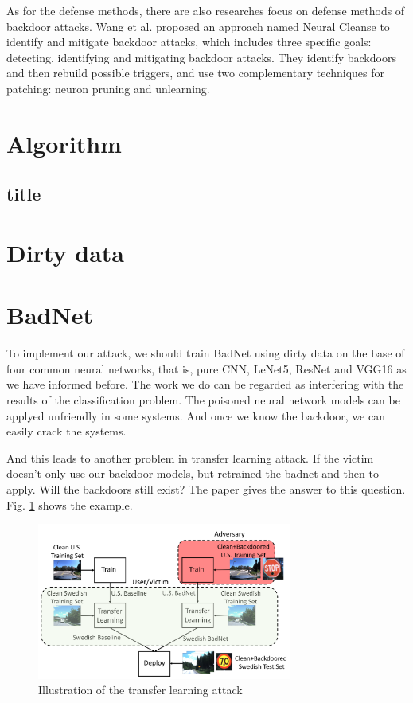 \documentclass[runningheads]{llncs}
\begin{document}
As for the defense methods, there are also researches focus on defense methods of backdoor attacks. Wang et al. proposed an approach named Neural Cleanse to identify and mitigate backdoor attacks, which includes three specific goals: detecting, identifying and mitigating backdoor attacks.\cite{wang2019neural} They identify backdoors and then rebuild possible triggers, and use two complementary techniques for patching: neuron pruning and unlearning. 

\section{Algorithm}

\subsection{title}

\section{Dirty data}\label{generate method}

\section{BadNet}

To implement our attack, we should train BadNet using dirty data on the base of four common neural networks, that is, pure CNN, LeNet5, ResNet and VGG16 as we have informed before. The work we do can be regarded as interfering with the results of the classification problem. The poisoned neural network models can be applyed unfriendly in some systems. And once we know the backdoor, we can easily crack the systems.

And this leads to another problem in transfer learning attack. If the victim doesn't only use our backdoor models, but retrained the badnet and then to apply. Will the backdoors still exist? The paper\cite{gu2017badnets} gives the answer to this question. Fig. \ref{transfer} shows the example.

\begin{figure}[h]
	\centering
	\includegraphics[width=3.3in]{figures/transfer.png}
	\caption{Illustration of the transfer learning attack} \label{transfer}
\end{figure}
\end{document}
